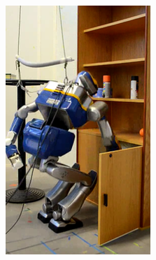 \begin{figure}
\begin{subfigure}{0.19\columnwidth}
    \includegraphics[width = \columnwidth]
                    {src/chap3-optimal-motion-planning/figure/shelves-5.png}
    \label{shelves-5}
  \end{subfigure}
  \begin{subfigure}{0.19\columnwidth}
    \centering

\end{subfigure}
\end{figure}

